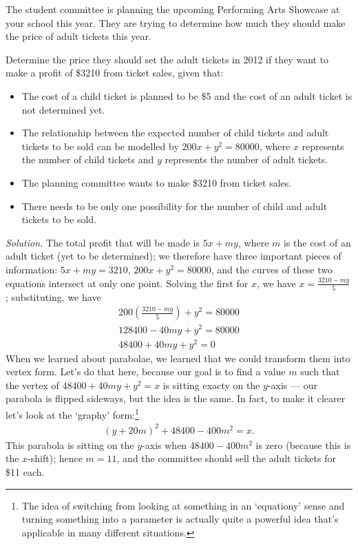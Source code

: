 \begin{ex}

  The student committee is planning the upcoming Performing Arts Showcase at your school this year. They are trying to determine how much they
  should make the price of adult tickets this year.

  Determine the price they should set the adult tickets in 2012 if they want to make a profit of \$3210 from ticket sales, given that:
  \begin{itemize}
    \item The cost of a child ticket is planned to be \$5 and the cost of an adult ticket is not determined yet.
    \item The relationship between the expected number of child tickets and adult tickets to be sold can be modelled by $ 200x + y^2 = 80000 $,
           where $x$ represents the number of child tickets and $y$ represents the number of adult tickets.
    \item The planning committee wants to make \$3210 from ticket sales.
    \item There needs to be only one possibility for the number of child and adult tickets to be sold.
  \end{itemize}

  \textit{Solution.} The total profit that will be made is $ 5x + my $, where $ m $ is the cost of an adult ticket (yet to be determined);
  we therefore have three important pieces of information: $ 5x + my = 3210 $, $ 200x + y^2 = 80000 $, and the curves of these two equations
  intersect at only one point. Solving the first for $ x $, we have $ x = \frac{3210 - my}{5} $; substituting, we have
  \begin{gather*}
    200\left(\frac{3210 - my}{5}\right) + y^2 = 80000\\
    128400 - 40my + y^2 = 80000\\
    48400 + 40my + y^2 = 0
  \end{gather*}
  When we learned about parabolae, we learned that we could transform them into vertex form. Let's do that here, because our goal
  is to find a value $ m $ such that the vertex of $ 48400 + 40my + y^2 = x $ is sitting exacty on the $ y$-axis --- our parabola is flipped
  sideways, but the idea is the same. In fact, to make it clearer let's look at the `graphy' form:\footnote{The idea of switching from looking
  at something in an `equationy' sense and turning something into a parameter is actually quite a powerful idea that's applicable in many
  different situations.}
  \begin{gather*}
    (y + 20m)^2 + 48400 - 400m^2 = x.
  \end{gather*}
  This parabola is sitting on the $ y$-axis when $ 48400 - 400m^2 $ is zero (because this is the $ x$-shift); hence $ m = 11 $,
  and the committee should sell the adult tickets for \$11 each.
\end{ex}

